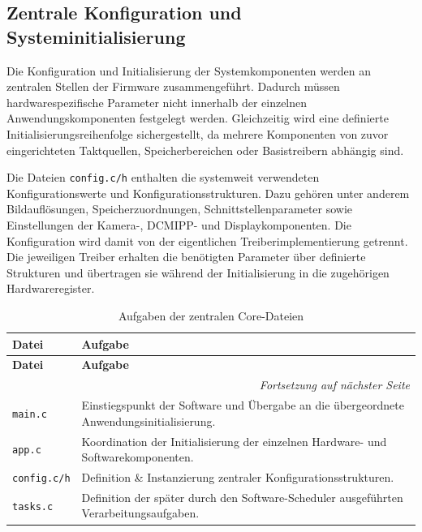 \subsection{Zentrale Konfiguration und Systeminitialisierung}

Die Konfiguration und Initialisierung der Systemkomponenten werden an zentralen Stellen der Firmware zusammengeführt. Dadurch müssen hardwarespezifische Parameter nicht innerhalb der einzelnen Anwendungskomponenten festgelegt werden. Gleichzeitig wird eine definierte Initialisierungsreihenfolge sichergestellt, da mehrere Komponenten von zuvor eingerichteten Taktquellen, Speicherbereichen oder Basistreibern abhängig sind.

Die Dateien \texttt{config.c/h} enthalten die systemweit verwendeten Konfigurationswerte und Konfigurationsstrukturen. Dazu gehören unter anderem Bildauflösungen, Speicherzuordnungen, Schnittstellenparameter sowie Einstellungen der Kamera-, DCMIPP- und Displaykomponenten. Die Konfiguration wird damit von der eigentlichen Treiberimplementierung getrennt. Die jeweiligen Treiber erhalten die benötigten Parameter über definierte Strukturen und übertragen sie während der Initialisierung in die zugehörigen Hardwareregister.

\begin{longtable}{|p{}|p{}|}
    \caption{Aufgaben der zentralen Core-Dateien}
    \label{tab:core-dateien} \\
    \hline
    \textbf{Datei} & \textbf{Aufgabe} \\
    \hline
    \endfirsthead
    \hline
    \textbf{Datei} & \textbf{Aufgabe} \\
    \hline
    \endhead
    \hline
    \multicolumn{2}{r}{\textit{Fortsetzung auf nächster Seite}} \\
    \endfoot
    \hline
    \endlastfoot
    \texttt{main.c} & Einstiegspunkt der Software und Übergabe an die übergeordnete Anwendungsinitialisierung. \\
    \hline
    \texttt{app.c} & Koordination der Initialisierung der einzelnen Hardware- und Softwarekomponenten. \\
    \hline
    \texttt{config.c/h} & Definition \& Instanzierung zentraler Konfigurationsstrukturen. \\
    \hline
    \texttt{tasks.c} & Definition der später durch den Software-Scheduler ausgeführten Verarbeitungsaufgaben. \\
    \hline
\end{longtable}

